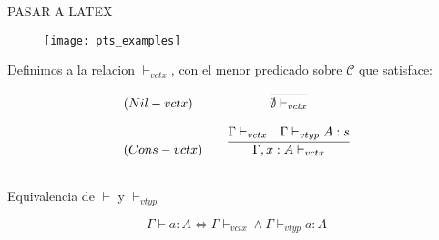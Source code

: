 PASAR A LATEX

\begin{figure}[h]
\centering
\texttt{[image: pts\_examples]}
\end{figure}

\begin{definition}
Definimos a la relacion $\vdash_{vctx}$, con el menor predicado sobre $\mathcal{C}$ que satisface:

\[
\begin{array}{llcr}
	(Nil-vctx)  & &\infer{\emptyset \vdash_{vctx}}{} \\ \\ 
	(Cons-vctx) & &\infer{\Gamma, x:A \vdash_{vctx}}{\Gamma \vdash_{vctx} & \Gamma \vdash_{vtyp} A : s} \\ \\ 
	

	
\end{array}
\]

\begin{lemma}{Equivalencia de $\vdash$ y $\vdash_{vtyp}$}

\begin{equation}
\Gamma \vdash a : A \Leftrightarrow \Gamma \vdash_{vctx} \land \Gamma \vdash_{vtyp} a:A
\end{equation}
\end{lemma}

\end{definition}
